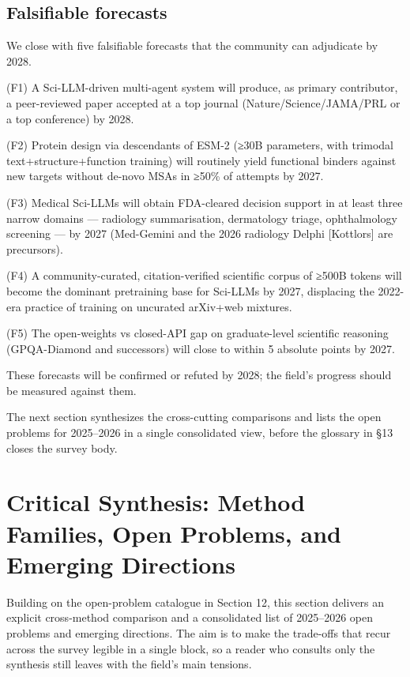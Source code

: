 \documentclass{article}
\begin{document}
\subsection{Falsifiable forecasts}\label{falsifiable-forecasts}

We close with five falsifiable forecasts that the community can adjudicate by 2028.

(F1) A Sci-LLM-driven multi-agent system will produce, as primary contributor, a peer-reviewed paper accepted at a top journal (Nature/Science/JAMA/PRL or a top conference) by 2028.

(F2) Protein design via descendants of ESM-2 (≥30B parameters, with trimodal text+structure+function training) will routinely yield functional binders against new targets without de-novo MSAs in ≥50\% of attempts by 2027.

(F3) Medical Sci-LLMs will obtain FDA-cleared decision support in at least three narrow domains --- radiology summarisation, dermatology triage, ophthalmology screening --- by 2027 (Med-Gemini \cite{yang2024advancingmultimoda} and the 2026 radiology Delphi {[}Kottlors{]} are precursors).

(F4) A community-curated, citation-verified scientific corpus of ≥500B tokens will become the dominant pretraining base for Sci-LLMs by 2027, displacing the 2022-era practice of training on uncurated arXiv+web mixtures.

(F5) The open-weights vs closed-API gap on graduate-level scientific reasoning (GPQA-Diamond and successors) will close to within 5 absolute points by 2027.

These forecasts will be confirmed or refuted by 2028; the field's progress should be measured against them.

The next section synthesizes the cross-cutting comparisons and lists the open problems for 2025--2026 in a single consolidated view, before the glossary in §13 closes the survey body.

\section{Critical Synthesis: Method Families, Open Problems, and Emerging Directions}\label{critical-synthesis-method-families-open-problems-and-emerging-directions}

Building on the open-problem catalogue in Section 12, this section delivers an explicit cross-method comparison and a consolidated list of 2025--2026 open problems and emerging directions. The aim is to make the trade-offs that recur across the survey legible in a single block, so a reader who consults only the synthesis still leaves with the field's main tensions.
\end{document}
